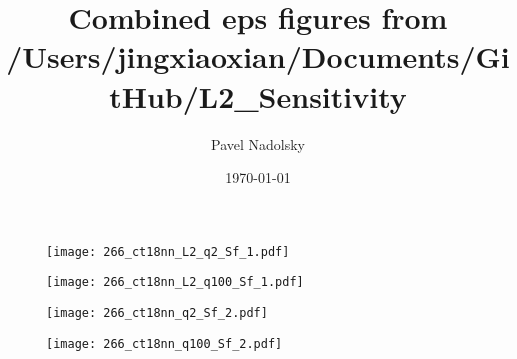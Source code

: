 \documentclass[10pt,aps,prd,floatfix,titlepage]{revtex4}
\begin{document}
\title{Combined eps figures from /Users/jingxiaoxian/Documents/GitHub/L2\_Sensitivity}
\date{\today}
\author{Pavel Nadolsky}
\maketitle
\begin{figure}
\texttt{[image: 266\_ct18nn\_L2\_q2\_Sf\_1.pdf]}
\caption{}
\end{figure}
\begin{figure}
\texttt{[image: 266\_ct18nn\_L2\_q100\_Sf\_1.pdf]}
\caption{}
\end{figure}
\clearpage
\begin{figure}
\texttt{[image: 266\_ct18nn\_q2\_Sf\_2.pdf]}
\caption{}
\end{figure}
\begin{figure}
\texttt{[image: 266\_ct18nn\_q100\_Sf\_2.pdf]}
\caption{}
\end{figure}
\clearpage
\end{document}
